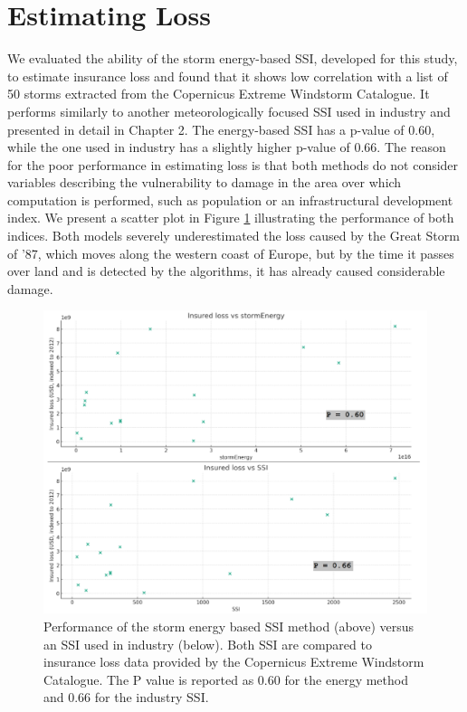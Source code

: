 \section{Estimating Loss}

    We evaluated the ability of the storm energy-based SSI, developed for this study, to estimate insurance loss and found that it shows low correlation with a list of 50 storms extracted from the Copernicus Extreme Windstorm Catalogue. It performs similarly to another meteorologically focused SSI used in industry and presented in detail in Chapter 2. The energy-based SSI has a p-value of 0.60, while the one used in industry has a slightly higher p-value of 0.66. The reason for the poor performance in estimating loss is that both methods do not consider variables describing the vulnerability to damage in the area over which computation is performed, such as population or an infrastructural development index. We present a scatter plot in Figure \ref{fig:scatterSSI} illustrating the performance of both indices. Both models severely underestimated the loss caused by the Great Storm of '87, which moves along the western coast of Europe, but by the time it passes over land and is detected by the algorithms, it has already caused considerable damage.
    
        \begin{figure}
            \centering
            \includegraphics[width=\textwidth]{figures/ssiperformance.png}
            \caption{Performance of the storm energy based SSI method (above) versus an SSI used in industry (below). Both SSI are compared to insurance loss data provided by the Copernicus Extreme Windstorm Catalogue. The P value is reported as 0.60 for the energy method and 0.66 for the industry SSI.}
            \label{fig:scatterSSI}
        \end{figure}

